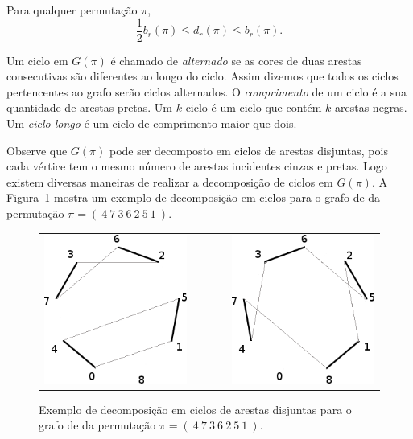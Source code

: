 \begin{teo}
\label{teo:rev_bkp_bound}
Para qualquer permutação $\pi$, 
\[\frac{1}{2} b_r(\pi) \leq d_r(\pi) \leq
  b_r(\pi).
\]
\end{teo}

Um ciclo em $G(\pi)$ é chamado de \textit{alternado} se as cores de
duas arestas consecutivas são diferentes ao longo do ciclo. Assim
dizemos que todos os ciclos pertencentes ao grafo serão ciclos
alternados. O \textit{comprimento} de um ciclo é a sua quantidade de
arestas pretas. Um $k$-ciclo é um ciclo que contém $k$ arestas
negras. Um \textit{ciclo longo} é um ciclo de comprimento maior que
dois.

Observe que $G(\pi)$ pode ser decomposto em ciclos de arestas
disjuntas, pois cada vértice tem o mesmo número de arestas incidentes
cinzas e pretas. Logo existem diversas maneiras de realizar a
decomposição de ciclos em $G(\pi)$. A
Figura~\ref{fig:rev_grafo_bkp_dec2cic} mostra um exemplo de
decomposição em ciclos para o grafo de \bkp{} da permutação $\pi =
(~4~7~3~6~2~5~1~)$.

\begin{figure}[h]
  \centering 
  \begin{tabular}{ccc} 
  \includegraphics[scale=0.6]{images/rev_grafo_bkp_dec2cic-1.png}
  & ~~~~
  & \includegraphics[scale=0.6]{images/rev_grafo_bkp_dec2cic-2.png} 
  \end{tabular} 
  \caption{Exemplo de decomposição em ciclos de arestas disjuntas para
  o grafo de \bkp{} da permutação $\pi = (~4~7~3~6~2~5~1~)$.}
  \label{fig:rev_grafo_bkp_dec2cic}
\end{figure}

